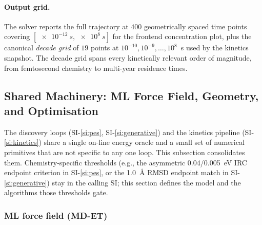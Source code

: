 \paragraph{Output grid.}
The solver reports the full trajectory at $400$ geometrically spaced time points covering $[\SI{e-12}{s}, \SI{e8}{s}]$ for the frontend concentration plot, plus the canonical \emph{decade grid} of $19$ points at $10^{-10}, 10^{-9}, \ldots, 10^{8}$~s used by the kinetics snapshot. The decade grid spans every kinetically relevant order of magnitude, from femtosecond chemistry to multi-year residence times.


%

\subsection{Shared Machinery: ML Force Field, Geometry, and Optimisation}
\label{si:shared}

The discovery loops (SI-\ref{si:pes}, SI-\ref{si:generative}) and the kinetics pipeline (SI-\ref{si:kinetics}) share a single on-line energy oracle and a small set of numerical primitives that are not specific to any one loop. This subsection consolidates them. Chemistry-specific thresholds (e.g., the asymmetric \SI{0.04}{}/\SI{0.005}{eV} IRC endpoint criterion in SI-\ref{si:pes}, or the \SI{1.0}{\angstrom} RMSD endpoint match in SI-\ref{si:generative}) stay in the calling SI; this section defines the model and the algorithms those thresholds gate.

\subsubsection{ML force field (MD-ET)}
\label{sec:shared-mdet}

